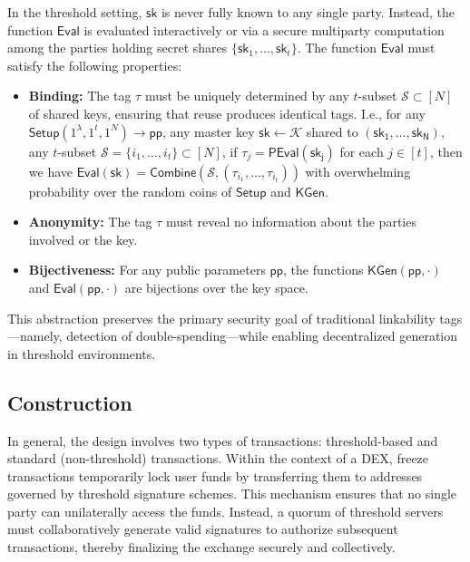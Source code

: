 In the threshold setting, $\mathsf{sk}$ is never fully known to any single party. Instead, the function $\mathsf{Eval}$ is evaluated interactively or via a secure multiparty computation among the parties holding secret shares $\{\mathsf{sk}_1, \ldots, \mathsf{sk}_t\}$. The function $\mathsf{Eval}$ must satisfy the following properties:
\begin{itemize}
    \item \textbf{Binding:} The tag $\tau$ must be uniquely determined by any $t$-subset $\mathcal{S} \subset [N]$ of shared keys, ensuring that reuse produces identical tags. I.e., for any $ \mathsf{Setup} (1^\lambda, 1^t, 1^N) \to \mathsf{pp}$, any
master key $\mathsf{sk} \gets \mathcal{K}$ shared to $(\mathsf{sk_1}, \ldots, \mathsf{sk_N})$, any $t$-subset $\mathcal{S} = \{i_1, \ldots, i_t\} \subset [N]$, if $\tau_j = \mathsf{PEval}(\mathsf{sk_j})$ for each $j \in [t]$, then
we have $\mathsf{Eval}(\mathsf{sk}) = \mathsf{Combine}(\mathcal{S}, (\tau_{i_1}, \ldots, \tau_{i_t}))$ with overwhelming probability over the
random coins of $\mathsf{Setup}$ and $\mathsf{KGen}$. 
    \item \textbf{Anonymity:} The tag $\tau$ must reveal no information about the parties involved or the key.
    \item \textbf{Bijectiveness:} For any public parameters $\mathsf{pp}$, the functions $\mathsf{KGen(pp, \cdot)}$ and $\mathsf{Eval(pp, \cdot)}$ are bijections over the key space.
\end{itemize}

This abstraction preserves the primary security goal of traditional linkability tags—namely, detection of double-spending—while enabling decentralized generation in threshold environments.


\subsection{Construction}
In general, the design involves two types of transactions: threshold-based and standard (non-threshold) transactions. Within the context of a DEX, freeze transactions temporarily lock user funds by transferring them to addresses governed by threshold signature schemes. This mechanism ensures that no single party can unilaterally access the funds. Instead, a quorum of threshold servers must collaboratively generate valid signatures to authorize subsequent transactions, thereby finalizing the exchange securely and collectively. 

\newpage
